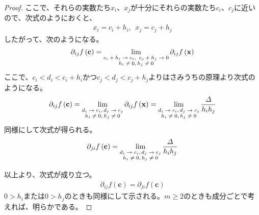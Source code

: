 \documentclass[dvipdfmx]{jsarticle}
\begin{document}
\begin{proof}
ここで、それらの実数たち$x_{i}$、$x_{j}$が十分にそれらの実数たち$c_{i}$、$c_{j}$に近いので、次式のようにおくと、
\begin{align*}
x_{i} = c_{i} + h_{i},\ \ x_{j} = c_{j} + h_{j}
\end{align*}
したがって、次のようになる。
\begin{align*}
\partial_{ij}f\left( \mathbf{c} \right) = \lim_{\scriptsize \begin{matrix}
c_{i} + h_{i} \rightarrow c_{i},\ c_{j} + h_{j} \rightarrow 0 \\
h_{i} \neq 0,h_{j} \neq 0 \\
\end{matrix}}{\partial_{ij}f\left( \mathbf{x} \right)}
\end{align*}
ここで、$c_{i} < d_{i} < c_{i} + h_{i}$かつ$c_{j} < d_{j} < c_{j} + h_{j}$よりはさみうちの原理より次式のようになる。
\begin{align*}
\partial_{ij}f\left( \mathbf{c} \right) = \lim_{\scriptsize \begin{matrix}
d_{i} \rightarrow c_{i},d_{j} \rightarrow c_{j} \\
h_{i} \neq 0,h_{j} \neq 0 \\
\end{matrix}}{\partial_{ij}f\left( \mathbf{x} \right)} = \lim_{\scriptsize \begin{matrix}
d_{i} \rightarrow c_{i},d_{j} \rightarrow c_{j} \\
h_{i} \neq 0,h_{j} \neq 0 \\
\end{matrix}}\frac{\varDelta}{h_{i}h_{j}}
\end{align*}
同様にして次式が得られる。
\begin{align*}
\partial_{ji}f\left( \mathbf{c} \right) = \lim_{\scriptsize \begin{matrix}
d_{i} \rightarrow c_{i},d_{j} \rightarrow c_{j} \\
h_{i} \neq 0,h_{j} \neq 0 \\
\end{matrix}}\frac{\varDelta}{h_{i}h_{j}}
\end{align*}\par
以上より、次式が成り立つ。
\begin{align*}
\partial_{ij}f\left( \mathbf{c} \right) = \partial_{ji}f\left( \mathbf{c} \right)
\end{align*}
$0 > h_{i}$または$0 > h_{j}$のときも同様にして示される。$m \geq 2$のときも成分ごとで考えれば、明らかである。
\end{proof}
\end{document}

